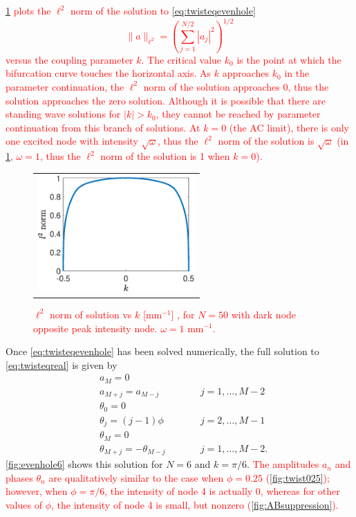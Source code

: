 \documentclass[reprint, amsmath,amssymb,aps,pra]{revtex4-2}
\renewcommand{\revised}[1]{ \textcolor{red}{#1} }
\begin{document}
\revised{
\cref{fig:evenbif} plots the $\ell^2$ norm of the solution to \cref{eq:twisteqevenhole}
\begin{equation}
\| a \|_{\ell^2} = \left( \sum_{j=1}^{N/2} |a_j|^2 \right)^{1/2}
\end{equation}
 versus the coupling parameter $k$. The critical value $k_0$ is the point at which the bifurcation curve touches the horizontal axis. As $k$ approaches $k_0$ in the parameter continuation, the $\ell^2$ norm of the solution approaches 0, thus the solution approaches the zero solution. Although it is possible that there are standing wave solutions for $|k| > k_0$, they cannot be reached by parameter continuation from this branch of solutions. At $k = 0$ (the AC limit), there is only one excited node with intensity $\sqrt{\omega}$, thus the $\ell^2$ norm of the solution is $\sqrt{\omega}$ (in \cref{fig:evenbif}, $\omega = 1$, thus the $\ell^2$ norm of the solution is 1 when $k = 0$).
\begin{figure}
\begin{center}
\begin{tabular}{c}
\includegraphics[width=6cm]{evenbif50.eps} 
\end{tabular}
\end{center}
\caption{$\ell^2$ norm of solution vs $k$ [$\text{mm}^{-1}$] , for $N = 50$ with dark node opposite peak intensity node. $\omega = 1 \text{ mm}^{-1}$.}
\label{fig:evenbif}
\end{figure}
}

Once \cref{eq:twisteqevenhole} has been solved numerically, the full solution to \cref{eq:twisteqreal} is given by
\begin{align*}
&a_M = 0 \\
&a_{M+j} = a_{M-j} && \qquad j = 1, \dots, M-2 \\
&\theta_0 = 0 \\
&\theta_j = (j-1)\phi && \qquad  j = 2, \dots, M-1 \\
&\theta_M = 0 \\
&\theta_{M+j} = -\theta_{M-j} && \qquad j = 1, \dots, M-2.
\end{align*}
\cref{fig:evenhole6} shows this solution for $N=6$ and $k=\pi/6$. \revised{The amplitudes $a_n$ and phases $\theta_n$ are qualitatively similar to the case when $\phi = 0.25$ (\cref{fig:twist025}); however, when $\phi = \pi/6$, the intensity of node 4 is actually 0, whereas for other values of $\phi$, the intensity of node 4 is small, but nonzero (\cref{fig:ABsuppression}). }
\end{document}

